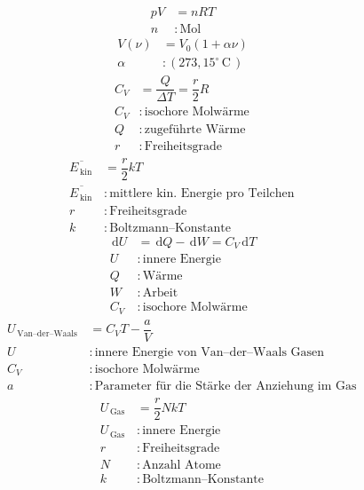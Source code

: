 \documentclass[a4paper,12pt]{article}
\newcommand{\td}{\,\text{d}}
\numberwithin{equation}{section}
\begin{document}
\begin{align} 
        pV&=nRT\\
        n&:\,\text{Mol}\,\nonumber 
\end{align} 
\begin{align} 
        V\left(\nu \right)&=V_0\left(1+\alpha \nu \right)\\
        \alpha &:\left(273,15^\circ\,\text{C}\,\right)\nonumber 
\end{align} 
\begin{align} 
        C_V&=\dfrac{Q}{\Delta T}=\dfrac{r}{2}R\\
        C_V&:\,\text{isochore Molwärme}\,\nonumber \\
        Q&:\,\text{zugeführte Wärme}\,\nonumber \\
        r&:\,\text{Freiheitsgrade}\,\nonumber 
\end{align} 
\begin{align} 
        \overline{E_{\,\text{kin}\,}}&=\dfrac{r}{2}kT\\
        \overline{E_{\,\text{kin}\,}}&:\,\text{mittlere kin.\ Energie pro Teilchen}\,\nonumber \\
        r&:\,\text{Freiheitsgrade}\,\nonumber \\
        k&:\,\text{Boltzmann--Konstante}\,\nonumber 
\end{align} 
\begin{align} 
        \td U&=\td Q-\td W=C_V\td T\\
        U&:\,\text{innere Energie}\,\nonumber \\
        Q&:\,\text{Wärme}\,\nonumber \\
        W&:\,\text{Arbeit}\,\nonumber \\
        C_V&:\,\text{isochore Molwärme}\,\nonumber 
\end{align} 
\begin{align} 
        U_{\,\text{Van--der--Waals}\,}&=C_VT-\dfrac{a}{V}\\
        U&:\,\text{innere Energie von Van--der--Waals Gasen}\,\nonumber \\
        C_V&:\,\text{isochore Molwärme}\,\nonumber \\
        a&:\,\text{Parameter für die Stärke der Anziehung im Gas}\,\nonumber 
\end{align} 
\begin{align} 
        U_{\,\text{Gas}\,}&=\dfrac{r}{2}NkT\\
        U_{\,\text{Gas}\,}&:\,\text{innere Energie}\,\nonumber \\
        r&:\,\text{Freiheitsgrade}\,\nonumber \\
        N&:\,\text{Anzahl Atome}\,\nonumber \\
        k&:\,\text{Boltzmann--Konstante}\,\nonumber 
\end{align} 
\end{document}
